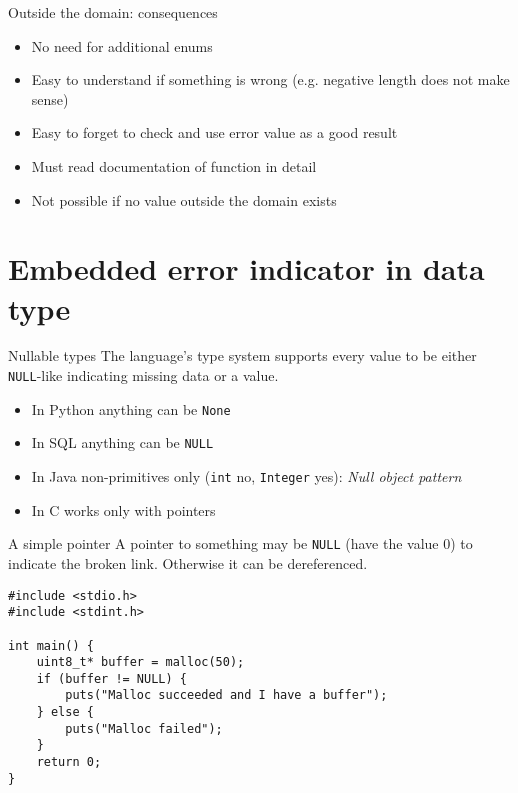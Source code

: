 \documentclass[aspectratio=169,14pt]{beamer}
\begin{document}
\begin{frame}[fragile]{Outside the domain: consequences}
\begin{itemize}
    \item[\good] No need for additional enums
    \item[\good] Easy to understand if something is wrong (e.g. negative length does not make sense)
    \item[\bad] Easy to forget to check and use error value as a good result
    \item[\bad] Must read documentation of function in detail 
    \item[\bad] Not possible if no value outside the domain exists
\end{itemize}
\end{frame}





\section{Embedded error indicator in data type}

\begin{frame}{Nullable types}
The language's type system supports every value to be either \texttt{NULL}-like indicating missing data or a value.

\begin{itemize}
    \item In Python anything can be \texttt{None}
    \item In SQL anything can be \texttt{NULL}
    \item In Java non-primitives only (\texttt{int} no, \texttt{Integer} yes): \textit{Null object pattern}
    \item In C works only with pointers
\end{itemize}
\end{frame}



\begin{frame}[fragile]{A simple pointer}
A pointer to something may be \texttt{NULL} (have the value 0) to indicate the broken link. Otherwise it can be dereferenced.

\begin{lstlisting}[style=cstyle]
#include <stdio.h>
#include <stdint.h>

int main() {
    uint8_t* buffer = malloc(50);
    if (buffer != NULL) {
        puts("Malloc succeeded and I have a buffer");
    } else {
        puts("Malloc failed");
    }
    return 0;
}
\end{lstlisting}
\end{frame}
\end{document}
